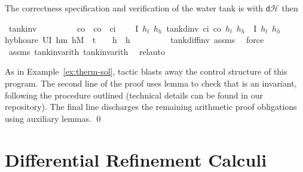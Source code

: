 \documentclass[envcountsame,envcountsect]{llncs}
\newcommand{\dH}{\mathsf{d}\mathcal{H}}
\begin{document}
\begin{example}
\noindent The correctness specification and verification of the water
tank is with $\dH$ then
\begin{isabellebody}
\isanewline
{}\isamarkupfalse%
\ tank{\isacharunderscore}inv{\isacharcolon}\isanewline
\ \ \ {\isachardoublequoteopen}{}\ {\isasymle}\ {\isasymtau}{\isachardoublequoteclose}\ \ {\isachardoublequoteopen}{}\ {\isacharless}\ c\isactrlsub o{\isachardoublequoteclose}\ \ {\isachardoublequoteopen}c\isactrlsub o\ {\isacharless}\ c\isactrlsub i{\isachardoublequoteclose}\isanewline
\ \ \ {\isachardoublequoteopen}\ \isactrlbold {\isacharbraceleft}I\ $h_l$\ $h_h$\isactrlbold {\isacharbraceright}\ tank{\isacharunderscore}dinv\ c\isactrlsub i\ c\isactrlsub o\ $h_l$\ $h_h$\ {\isasymtau}\ \isactrlbold {\isacharbraceleft}I\ $h_l$\ $h_h$\isactrlbold {\isacharbraceright}{\isachardoublequoteclose}\isanewline
\ \ \isamarkupfalse%
{\isacharparenleft}hyb{\isacharunderscore}hoare\ {\isachardoublequoteopen}U{\isacharparenleft}I\ h\isactrlsub m\ h\isactrlsub M\ {\isasymand}\ t\ {\isacharequal}\ {}\ {\isasymand}\ h\ {\isacharequal}\ h{\isacharparenright}{\isachardoublequoteclose}{\isacharparenright}\isanewline
\ \ \isamarkupfalse%
\ {}\ \isamarkupfalse%
\ {}\ \isamarkupfalse%
\ tank{\isacharunderscore}diff{\isacharunderscore}inv\ assms\ \isamarkupfalse%
\ force{\isacharplus}\isanewline
\ \ \isamarkupfalse%
\ assms\ tank{\isacharunderscore}inv{\isacharunderscore}arith{}\ tank{\isacharunderscore}inv{\isacharunderscore}arith{}\ \isamarkupfalse%
\ rel{\isacharunderscore}auto{\isacharprime}\isanewline
\end{isabellebody}

\noindent As in Example~\ref{ex:therm-sol}, tactic  blasts away
the control structure of this program. The second line of the proof
uses lemma  to check that  is an invariant,
following the procedure outlined (technical details can be found in
our repository). The final line discharges the remaining arithmetic
proof obligations using auxiliary lemmas. 
\qed
\end{example}


\section{Differential Refinement Calculi}\label{sec:refine}
\end{document}
